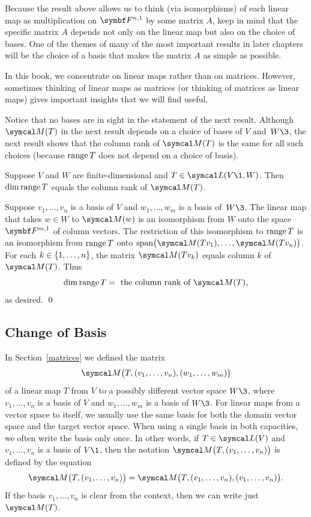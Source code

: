 Because the result above allows us to think (via isomorphisms) of each linear map as multiplication on $\F{n,1}$ by some matrix $A$, keep in mind that the specific matrix $A$ depends not only on the linear map but also on the choice of bases. One of the themes of many of the most important results in later chapters will be the choice of a basis that makes the matrix $A$ as simple as possible.

In this book, we concentrate on linear maps rather than on matrices. However, sometimes thinking of linear maps as matrices (or thinking of matrices as linear maps) gives important insights that we will find useful.

Notice that no bases are in sight in the statement of the next result. Although $\M(T)$ in the next result depends on a choice of bases of $V$ and~$W\3$, the next result shows that the column rank of $\M(T)$ is the same for all such choices (because $\operatorname{range} T$ does not depend on a choice of basis).

{Suppose $V$ and $W$ are finite-dimensional and $T \in \L(V\1, W)$. Then $\dim \operatorname{range} T$ equals the column rank of $\M(T)$.}

\proof
Suppose $v_1, \dots, v_n$ is a basis of $V$ and $w_1, \dots, w_m$ is a basis of~$W\3$.  The linear map that takes $w \in W$ to $\M(w)$ is an isomorphism from $W$ onto the space $\F{m,1}$ of  column vectors. The restriction of this isomorphism to $\operatorname{range} T$  is an isomorphism from $\operatorname{range} T$ onto $\Span\bigl( \M(Tv_1), \dots, \M(Tv_n) \bigr)$. For each $k \in \{1, \ldots, n\}$, the  matrix $\M(Tv_k)$ equals column $k$ of $\M(T)$. Thus
\[
\dim \ran T =  \text{ the column rank of } \M(T),
\]
as desired.
\qed

\subsection{Change of Basis}

In Section~\ref{matrices} we defined the matrix
\[
\M\bigl(T, (v_1, \dots, v_n), (w_1, \dots, w_m) \bigr)
\]
of a linear map $T$ from $V$ to a possibly different vector space $W\3$, where $v_1, \dots, v_n$ is a basis of $V$ and $w_1, \dots, w_m$ is a basis of $W\3$. For  linear maps from a vector space to itself, we usually use the same basis for both the domain vector space and the target vector space. When using a single basis in both capacities, we often write the basis only once. In other words, if $T \in \L(V)$ and $v_1, \dots, v_n$ is a basis of $V\1$, then the notation $\M\paren[\big]{ T, (v_1, \ldots, v_n) }$ is defined by the equation
\[
\M\paren[\big]{ T, (v_1, \ldots, v_n) } = \M\paren[\big]{ T, (v_1, \ldots, v_n), (v_1, \ldots, v_n) }.
\]
If the basis $v_1, \ldots, v_n$ is clear from the context, then we can write just $\M(T)$.

